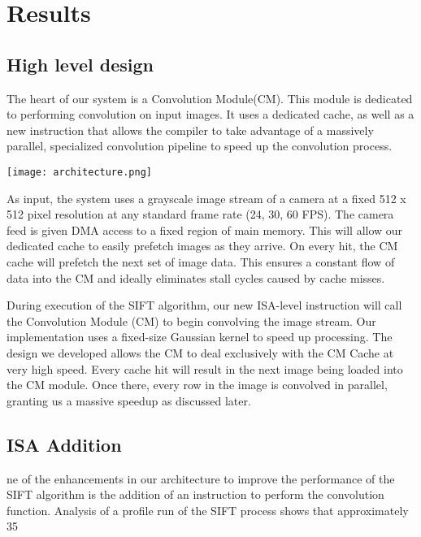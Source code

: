 \section{Results}

\subsection{High level design}
The heart of our system is a Convolution Module(CM).  This module is dedicated to performing convolution on input images.  It uses a dedicated cache, as well as a new instruction that allows the compiler to take advantage of a massively parallel, specialized convolution pipeline to speed up the convolution process.

\begin{center}
\texttt{[image: architecture.png]}%
\label{fig:architecture}%
\end{center}

As input, the system uses a grayscale image stream of a camera at a fixed 512 x 512 pixel resolution at any standard frame rate (24, 30, 60 FPS). The camera feed is given DMA access to a fixed region of main memory. This will allow our dedicated cache to easily prefetch images as they arrive. On every hit, the CM cache will prefetch the next set of image data. This ensures a constant flow of data into the CM and ideally eliminates stall cycles caused by cache misses.  

During execution of the SIFT algorithm, our new ISA-level instruction will call the Convolution Module (CM) to begin convolving the image stream. Our implementation uses a fixed-size Gaussian kernel to speed up processing.  The design we developed  allows the CM to deal exclusively with the CM Cache at very high speed. Every cache hit will result in the next image being loaded into the CM module. Once there, every row in the image is convolved in parallel, granting us a massive speedup as discussed later.


\subsection{ISA Addition}
ne of the enhancements in our architecture to improve the performance of the SIFT algorithm is the addition of an instruction to perform the convolution function. Analysis of a profile run of the SIFT process shows that approximately 35%

